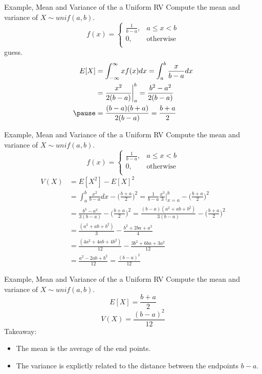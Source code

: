 \documentclass[handout]{beamer}
\begin{document}
\begin{frame}{Example, Mean and Variance of the a Uniform RV}
    Compute the mean and variance of $X\sim unif(a,b)$.
    \pause
    $$f(x)=\begin{cases} \frac{1}{b-a}, & a \leq x <b      \\
        0, & \text{otherwise} \\
    \end{cases}$$
    \pause guess.
    \pause
    \begin{align*}
         E[X] &= \int_{-\infty}^\infty xf(x) dx = \int_{a}^b \frac{x}{b-a} dx\\
         & = \frac{x^2}{2(b-a)} \bigg|_a^b = \frac{b^2 - a^2}{2(b-a)}\\
         \pause & =\frac{(b-a)(b+a)}{2(b-a)} = \frac{b+a}{2}
    \end{align*}
    \vfill
\end{frame}
\begin{frame}{Example, Mean and Variance of the a Uniform RV}
    Compute the mean and variance of $X\sim unif(a,b)$.
    \pause
    $$f(x)=\begin{cases} \frac{1}{b-a}, & a \leq x <b      \\
        0, & \text{otherwise} \\
    \end{cases}$$
    \begin{align*}
         V(X) &= E[X^2] - E[X]^2\\
         & = \int_a^b \frac{x^2}{b-a} dx - \bigg( \frac{b+a}{2} \bigg)^2 = \frac{1}{b-a} \frac{x^3}{3}\bigg|_{x=a}^b - \bigg( \frac{b+a}{2} \bigg)^2\\
         & = \frac{b^3 - a^3}{3(b-a)}  - \bigg( \frac{b+a}{2} \bigg)^2 = \frac{(b-a)(a^2+ab+b^2)}{3(b-a)}  - \bigg( \frac{b+a}{2} \bigg)^2\\
         & = \frac{(a^2+ab+b^2)}{3}  - \frac{b^2+2ba + a^2}{4} \\
         &= \frac{(4a^2+4ab+4b^2)}{12}  - \frac{3b^2+6ba + 3a^2}{12}\\
         & = \frac{a^2 - 2 ab + b^2}{12} = \frac{(b-a)^2}{12}
    \end{align*}
    \vfill
\end{frame}
\begin{frame}{Example, Mean and Variance of the a Uniform RV}
    Compute the mean and variance of $X\sim unif(a,b)$.
    $$ E[X] = \frac{b+a}{2} $$
    $$ V(X) = \frac{(b-a)^2}{12}$$
    Takeaway:
    \begin{itemize}
        \item The mean is the average of the end points.
        \item The variance is explictly related to the distance between the endpoints $b-a$.
    \end{itemize}
    \vfill
\end{frame}
\end{document}
